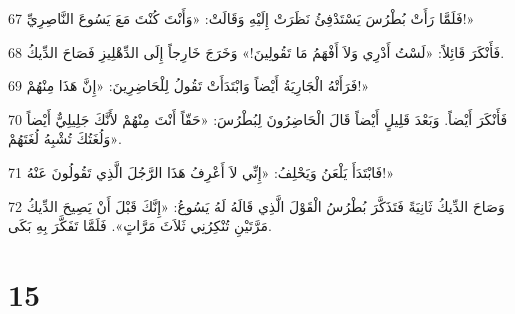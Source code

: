 \par 67 فَلَمَّا رَأَتْ بُطْرُسَ يَسْتَدْفِئُ نَظَرَتْ إِلَيْهِ وَقَالَتْ: «وَأَنْتَ كُنْتَ مَعَ يَسُوعَ النَّاصِرِيِّ!»
\par 68 فَأَنْكَرَ قَائِلاً: «لَسْتُ أَدْرِي وَلاَ أَفْهَمُ مَا تَقُولِينَ!» وَخَرَجَ خَارِجاً إِلَى الدِّهْلِيزِ فَصَاحَ الدِّيكُ.
\par 69 فَرَأَتْهُ الْجَارِيَةُ أَيْضاً وَابْتَدَأَتْ تَقُولُ لِلْحَاضِرِينَ: «إِنَّ هَذَا مِنْهُمْ!»
\par 70 فَأَنْكَرَ أَيْضاً. وَبَعْدَ قَلِيلٍ أَيْضاً قَالَ الْحَاضِرُونَ لِبُطْرُسَ: «حَقّاً أَنْتَ مِنْهُمْ لأَنَّكَ جَلِيلِيٌّ أَيْضاً وَلُغَتُكَ تُشْبِهُ لُغَتَهُمْ».
\par 71 فَابْتَدَأَ يَلْعَنُ وَيَحْلِفُ: «إِنِّي لاَ أَعْرِفُ هَذَا الرَّجُلَ الَّذِي تَقُولُونَ عَنْهُ!»
\par 72 وَصَاحَ الدِّيكُ ثَانِيَةً فَتَذَكَّرَ بُطْرُسُ الْقَوْلَ الَّذِي قَالَهُ لَهُ يَسُوعُ: «إِنَّكَ قَبْلَ أَنْ يَصِيحَ الدِّيكُ مَرَّتَيْنِ تُنْكِرُنِي ثَلاَثَ مَرَّاتٍ». فَلَمَّا تَفَكَّرَ بِهِ بَكَى.

\chapter{15}

